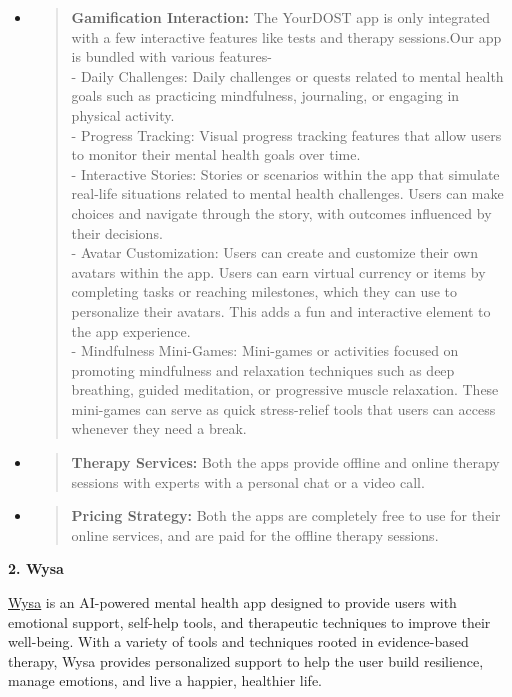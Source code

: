 \documentclass[manuscript,screen,review]{acmart}
\begin{document}
\begin{itemize}
\item
  \begin{quote}
  \textbf{Gamification Interaction:} The YourDOST app is only integrated
  with a few interactive features like tests and therapy sessions.Our
  app is bundled with various features-\\
  - Daily Challenges: Daily challenges or quests related to mental
  health goals such as practicing mindfulness, journaling, or engaging
  in physical activity.\\
  - Progress Tracking: Visual progress tracking features that allow
  users to monitor their mental health goals over time.\\
  - Interactive Stories: Stories or scenarios within the app that
  simulate real-life situations related to mental health challenges.
  Users can make choices and navigate through the story, with outcomes
  influenced by their decisions.\\
  - Avatar Customization: Users can create and customize their own
  avatars within the app. Users can earn virtual currency or items by
  completing tasks or reaching milestones, which they can use to
  personalize their avatars. This adds a fun and interactive element to
  the app experience.\\
  - Mindfulness Mini-Games: Mini-games or activities focused on
  promoting mindfulness and relaxation techniques such as deep
  breathing, guided meditation, or progressive muscle relaxation. These
  mini-games can serve as quick stress-relief tools that users can
  access whenever they need a break.
  \end{quote}
\item
  \begin{quote}
  \textbf{Therapy Services:} Both the apps provide offline and online
  therapy sessions with experts with a personal chat or a video call.
  \end{quote}
\item
  \begin{quote}
  \textbf{Pricing Strategy:} Both the apps are completely free to use
  for their online services, and are paid for the offline therapy
  sessions.
  \end{quote}
\end{itemize}

\textbf{2. Wysa}

\href{https://www.wysa.com/}{\uline{Wysa}} is an AI-powered mental
health app designed to provide users with emotional support, self-help
tools, and therapeutic techniques to improve their well-being. With a
variety of tools and techniques rooted in evidence-based therapy, Wysa
provides personalized support to help the user build resilience, manage
emotions, and live a happier, healthier life.
\end{document}
